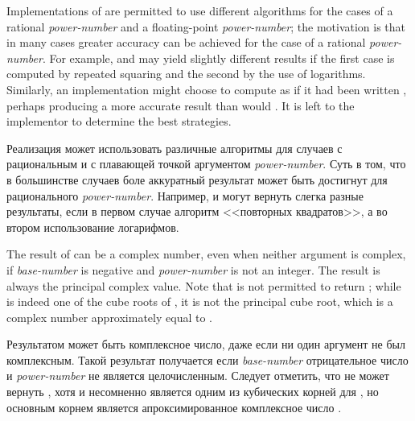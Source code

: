 \begin{defun}[Function]
Implementations of  are permitted to use different algorithms
for the cases of a rational \emph{power-number} and a floating-point
\emph{power-number}; the motivation is that in many cases greater accuracy
can be achieved for the case of a rational \emph{power-number}.
For example,  and  may yield
slightly different results if the first case is computed by repeated squaring
and the second by the use of logarithms.  Similarly, an implementation
might choose to compute  as if it had
been written , perhaps producing a more accurate
result than would .  It is left to the implementor
to determine the best strategies.

Реализация  может использовать различные алгоритмы для случаев с
рациональным и с плавающей точкой аргументом \emph{power-number}. Суть в том,
что в большинстве случаев боле аккуратный результат может быть достигнут для
рационального \emph{power-number}.
Например,  и   могут вернуть слегка разные
результаты, если в первом случае алгоритм <<повторных квадратов>>, а во втором
использование логарифмов.

The result of  can be a complex number, even when neither argument
is complex, if \emph{base-number} is negative and \emph{power-number}
is not an integer.  The result is always the principal complex value.
Note that  is not permitted to return ;
while  is indeed one of the cube roots of , it is
not the principal cube root, which is a complex number
approximately equal to .

Результатом  может быть комплексное число, даже если ни один аргумент
не был комплексным. Такой результат получается если \emph{base-number}
отрицательное число и \emph{power-number} не является целочисленным.
Следует отметить, что   не может вернуть , хотя и
 несомненно является одним из кубических корней для , но основным
корнем является апроксимированное комплексное число .
\end{defun}


